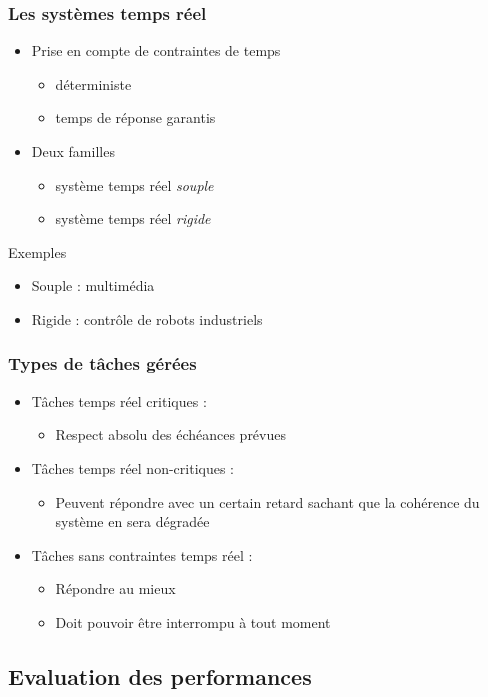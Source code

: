 \begin{frame}
\frametitle{Les systèmes temps réel}
\begin{itemize}
\item Prise en compte de contraintes de temps
\begin{itemize}
\item déterministe
\item temps de réponse garantis
\end{itemize}
\item Deux familles
\begin{itemize}
\item système temps réel \emph{souple}
\item système temps réel \emph{rigide}
\end{itemize}
\end{itemize}
\begin{exampleblock}{Exemples}
\begin{itemize}
\item Souple : multimédia
\item Rigide : contrôle de robots industriels
\end{itemize}
\end{exampleblock}
\end{frame}

\begin{frame}
\frametitle{Types de tâches gérées}
\begin{itemize}
\item Tâches temps réel critiques :
\begin{itemize}
\item Respect absolu des échéances prévues
\end{itemize}
\item Tâches temps réel non-critiques :
\begin{itemize}
\item Peuvent répondre avec un certain retard sachant que la cohérence
      du système en sera dégradée
\end{itemize}
\item Tâches sans contraintes temps réel :
\begin{itemize}
\item Répondre au mieux
\item Doit pouvoir être interrompu à tout moment
\end{itemize}
\end{itemize}
\end{frame}


\subsection{Evaluation des performances}

